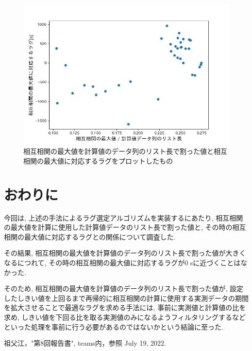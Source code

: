 \documentclass[a4j,12pt,]{jarticle}
\begin{document}
\begin{figure}[H]
  \begin{center}
    \includegraphics[width=160mm]{1.png}
    \caption{相互相関の最大値を計算値のデータ列のリスト長で割った値と相互相関の最大値に対応するラグをプロットしたもの}
    \label{p1}
  \end{center}
\end{figure}

\section{おわりに}
今回は, 上述の手法によるラグ選定アルゴリズムを実装するにあたり, 相互相関の最大値を計算に使用した計算値データのリスト長で割った値と, その時の相互相関の最大値に対応するラグとの関係について調査した.

その結果, 相互相関の最大値を計算値のデータ列のリスト長で割った値が大きくなるにつれて, その時の相互相関の最大値に対応するラグが0 \si{\second}に近づくことはなかった.

そのため, 相互相関の最大値を計算値のデータ列のリスト長で割った値が, 設定したしきい値を上回るまで再帰的に相互相関の計算に使用する実測データの期間を拡大させることで最適なラグを求める手法には, 事前に実測値と計算値の比を求め, しきい値を下回る比を取る実測値のみになるようフィルタリングするなどといった処理を事前に行う必要があるのではないかという結論に至った.

\begin{thebibliography}{5}
  祖父江，"第8回報告書", teams内，参照 July 19, 2022.
\end{thebibliography}
\end{document}
